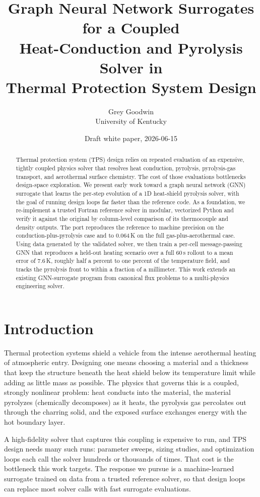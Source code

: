 \documentclass[11pt]{article}
\title{\vspace{-1.5em}Graph Neural Network Surrogates for a Coupled\\
Heat-Conduction and Pyrolysis Solver in\\ Thermal Protection System Design}
\author{Grey Goodwin \\ \small University of Kentucky}
\date{Draft white paper, 2026-06-15}
\begin{document}
\maketitle

\begin{abstract}
\noindent Thermal protection system (TPS) design relies on repeated evaluation of
an expensive, tightly coupled physics solver that resolves heat conduction,
pyrolysis, pyrolysis-gas transport, and aerothermal surface chemistry. The cost of
those evaluations bottlenecks design-space exploration. We present early work
toward a graph neural network (GNN) surrogate that learns the per-step evolution
of a 1D heat-shield pyrolysis solver, with the goal of running design loops far
faster than the reference code. As a foundation, we re-implement a trusted Fortran
reference solver in modular, vectorized Python and verify it against the original
by column-level comparison of its thermocouple and density outputs. The port
reproduces the reference to machine precision on the conduction-plus-pyrolysis
case and to 0.064\,K on the full gas-plus-aerothermal case. Using data generated
by the validated solver, we then train a per-cell message-passing GNN that
reproduces a held-out heating scenario over a full 60\,s rollout to a mean error
of 7.6\,K, roughly half a percent to one percent of the temperature field, and
tracks the pyrolysis front to within a fraction of a millimeter. This work extends
an existing GNN-surrogate program from canonical flux problems to a multi-physics
engineering solver.
\end{abstract}

\section{Introduction}

Thermal protection systems shield a vehicle from the intense aerothermal heating
of atmospheric entry. Designing one means choosing a material and a thickness that
keep the structure beneath the heat shield below its temperature limit while
adding as little mass as possible. The physics that governs this is a coupled,
strongly nonlinear problem: heat conducts into the material, the material
pyrolyzes (chemically decomposes) as it heats, the pyrolysis gas percolates out
through the charring solid, and the exposed surface exchanges energy with the hot
boundary layer.

A high-fidelity solver that captures this coupling is expensive to run, and TPS
design needs many such runs: parameter sweeps, sizing studies, and optimization
loops each call the solver hundreds or thousands of times. That cost is the
bottleneck this work targets. The response we pursue is a machine-learned
surrogate trained on data from a trusted reference solver, so that design loops
can replace most solver calls with fast surrogate evaluations.
\end{document}
